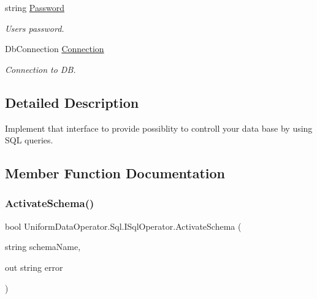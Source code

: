 \begin{DoxyCompactItemize}
string \mbox{\hyperlink{interface_uniform_data_operator_1_1_sql_1_1_i_sql_operator_a90f63ab37347ec080b37dc3256ead7a4}{Password}}
\begin{DoxyCompactList}\small\item\em User\textquotesingle{}s password. \end{DoxyCompactList}\item 
Db\+Connection \mbox{\hyperlink{interface_uniform_data_operator_1_1_sql_1_1_i_sql_operator_a99f034a986828e96955e3187cdfb28da}{Connection}}
\begin{DoxyCompactList}\small\item\em Connection to DB. \end{DoxyCompactList}\end{DoxyCompactItemize}


\subsection{Detailed Description}
Implement that interface to provide possiblity to controll your data base by using S\+QL queries. 



\subsection{Member Function Documentation}
\mbox{\label{interface_uniform_data_operator_1_1_sql_1_1_i_sql_operator_a5ae8328a464ef80f1ae1bd46a573c265}} 
\subsubsection{\texorpdfstring{Activate\+Schema()}{ActivateSchema()}}
{\footnotesize\ttfamily bool Uniform\+Data\+Operator.\+Sql.\+I\+Sql\+Operator.\+Activate\+Schema (\begin{DoxyParamCaption}\item[{string}]{schema\+Name,  }\item[{out string}]{error }\end{DoxyParamCaption})}



